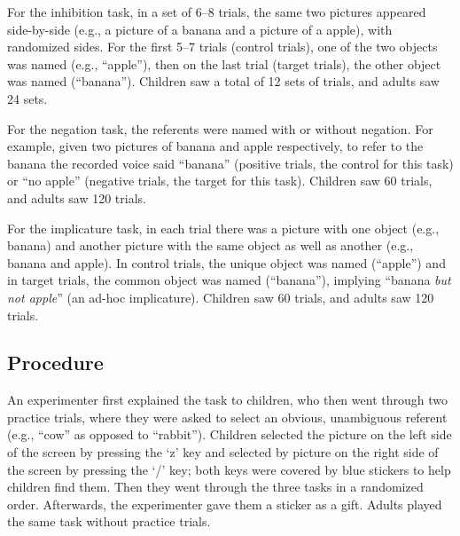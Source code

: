 \documentclass[10pt,letterpaper]{article}
\begin{document}
For the inhibition task, in a set of 6--8 trials, the same two pictures appeared side-by-side (e.g., a picture of a banana and a picture of a apple), with randomized sides. For the first 5--7 trials (control trials), one of the two objects was named (e.g., ``apple''), then on the last trial (target trials), the other object was named (``banana'').
Children saw a total of 12 sets of trials, and adults saw 24 sets.

For the negation task, the referents were named with or without negation. For example, given two pictures of banana and apple respectively, to refer to the banana the recorded voice said ``banana'' (positive trials, the control for this task) or ``no apple'' (negative trials, the target for this task). Children saw 60 trials, and adults saw 120 trials.

For the implicature task, in each trial there was a picture with one object (e.g., banana) and another picture with the same object as well as another (e.g., banana and apple). In control trials, the unique object was named (``apple'') and in target trials, the common object was named (``banana''), implying ``banana \emph{but not apple}'' (an ad-hoc implicature). Children saw 60 trials, and adults saw 120 trials.

\subsection{Procedure}

An experimenter first explained the task to children, who then went through two practice trials, where they were asked to select an obvious, unambiguous referent (e.g., ``cow'' as opposed to ``rabbit''). Children selected the picture on the left side of the screen by pressing the `z' key and selected by picture on the right side of the screen by pressing the `/' key; both keys were covered by blue stickers to help children find them. Then they went through the three tasks in a randomized order. Afterwards, the experimenter gave them a sticker as a gift. Adults played the same task without practice trials.
\end{document}
